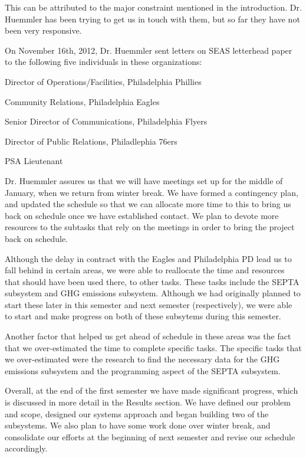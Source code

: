 \documentclass[12pt]{article}
\begin{document}
This can be attributed to the major constraint mentioned in the
introduction. Dr. Huemmler has been trying to get us in touch with
them, but so far they have not been very responsive.

On November 16th, 2012, Dr. Huemmler sent letters on SEAS letterhead
paper to the following five individuals in these organizations:
\begin{description}[style=nextline]
    \item[Mike DiMuzio]
  Director of Operations/Facilities, Philadelphia Phillies
    \item[Julie Hershey]
  Community Relations, Philadelphia Eagles
    \item[Zach Hill]
  Senior Director of Communications, Philadelphia Flyers
    \item[Michael Preston]
  Director of Public Relations, Philadlephia 76ers
    \item[Lt. John Hewitt]
  PSA Lieutenant
\end{description}

Dr. Huemmler assures us that we will have meetings set up for the
middle of January, when we return from winter break. We have formed a
contingency plan, and updated the schedule so that we can allocate
more time to this to bring us back on schedule once we have
established contact. We plan to devote more resources to the subtasks
that rely on the meetings in order to bring the project back on
schedule.

Although the delay in contract with the Eagles and Philadelphia PD
lead us to fall behind in certain areas, we were able to reallocate
the time and resources that should have been used there, to other
tasks. These tasks include the SEPTA subsystem and GHG emissions
subsystem. Although we had originally planned to start these later in
this semester and next semester (respectively), we were able to start
and make progress on both of these subsytems during this semester.

Another factor that helped us get ahead of schedule in these areas was
the fact that we over-estimated the time to complete specific
tasks. The specific tasks that we over-estimated were the research to
find the necessary data for the GHG emissions subsystem and the
programming aspect of the SEPTA subsystem.

Overall, at the end of the first semester we have made significant
progress, which is discussed in more detail in the Results section. We
have defined our problem and scope, designed our systems approach and
began building two of the subsystems. We also plan to have some work
done over winter break, and consolidate our efforts at the beginning
of next semester and revise our schedule accordingly.
\end{document}
